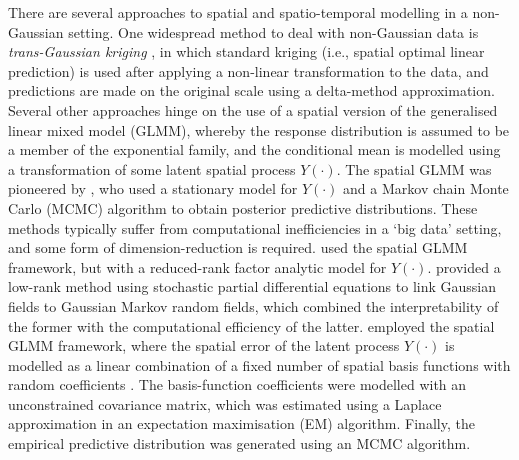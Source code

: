 \documentclass[article]{jss}
\begin{document}
There are several approaches to spatial and spatio-temporal modelling in a non-Gaussian setting.
One widespread method to deal with non-Gaussian data is \textit{trans-Gaussian kriging} \citep[pg.~137--138]{Cressie_1993_stats_for_spatial_data}, in which standard kriging (i.e., spatial optimal linear prediction) is used after applying a non-linear transformation to the data, and predictions are made on the original scale using a delta-method approximation. 
 Several other approaches hinge on the use of a spatial version of the generalised linear mixed model (GLMM), whereby the response distribution is assumed to be a member of the exponential family, and the conditional mean is modelled using a transformation of some latent spatial process $Y(\cdot)$. 
  The spatial GLMM was pioneered by \cite{Diggle_1998_spatial_GLMM}, who used a stationary model for $Y(\cdot)$ and a Markov chain Monte Carlo (MCMC) algorithm to obtain posterior predictive distributions. 
These methods typically suffer from computational inefficiencies in a `big data' setting, and some form of dimension-reduction is required. 
\cite{Lopes_2011_spatial_GLMM_reduced_rank_factor_analytic_model} used the spatial GLMM framework, but with a reduced-rank factor analytic model for $Y(\cdot)$. 
\cite{Lindgren_Rue_2011_GF_GMRF_SPDE} provided a low-rank method using stochastic partial differential equations to link Gaussian fields to Gaussian Markov random fields, which combined the interpretability of the former with the computational efficiency of the latter. 
\cite{Sengupta_Cressie_2013_spatial_GLMM_FRK} employed the spatial GLMM framework, where the spatial error of the latent process $Y(\cdot)$ is modelled as a linear combination of a fixed number of spatial basis functions with random coefficients \citep{Cressie_Johannesson_2008_FRK}. The basis-function coefficients were modelled with an unconstrained covariance matrix, which was estimated using a Laplace approximation in an expectation maximisation (EM) algorithm. Finally, the empirical predictive distribution was generated using an MCMC algorithm. 
\end{document}

